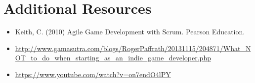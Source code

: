 \documentclass{../../fal_assignment}
\begin{document}
\section*{Additional Resources}

\begin{itemize}
    \item Keith, C. (2010) Agile Game Development with Scrum. Pearson Education.
    \item \url{http://www.gamasutra.com/blogs/RogerPaffrath/20131115/204871/What_NOT_to_do_when_starting_as_an_indie_game_developer.php}
    \item \url{https://www.youtube.com/watch?v=on7endO4lPY}
\end{itemize}

\rubricyeartwo

\end{document}
